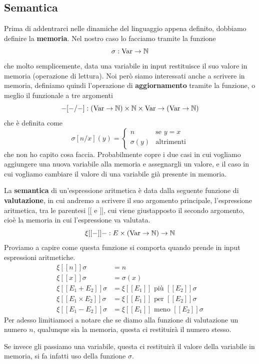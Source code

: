 \subsection{Semantica}
Prima di addentrarci nelle dinamiche del linguaggio appena
definito, dobbiamo definire la \textbf{memoria}. Nel nostro
caso lo facciamo tramite la funzione
\[ \sigma : \operatorname{Var} \to \mathbb{N} \]
che molto semplicemente, data una variabile in input
restituisce il suo valore in memoria (operazione di lettura).
Noi però siamo interessati anche a scrivere in memoria,
definiamo quindi l'operazione di \textbf{aggiornamento}
tramite la funzione, o meglio il funzionale a tre argomenti
\[
	- [ - / - ] : (\operatorname{Var} \to \mathbb{N}) \times
	\mathbb{N} \times \operatorname{Var} \to (\operatorname{Var} \to \mathbb{N})
\]
che è definita come
\[
	\sigma [n / x](y) = \begin{cases}
		n         & \text{se } y = x  \\
		\sigma(y) & \text{altrimenti}
	\end{cases}
\]
che non ho capito cosa faccia. Probabilmente copre i due casi
in cui vogliamo aggiungere una nuova variabile alla memoria
e assegnargli un valore, e il caso in cui vogliamo cambiare
il valore di una variabile già presente in memoria.

La \textbf{semantica} di un'espressione aritmetica è data
dalla seguente funzione di \textbf{valutazione}, in cui andremo
a scrivere il suo argomento principale, l'espressione aritmetica,
tra le parentesi $[[$ e $]]$, cui viene giustapposto il secondo
argomento, cioè la memoria in cui l'espressione va valutata.
\[ \xi [[-]] - : E \times (\operatorname{Var} \to \mathbb{N}) \to \mathbb{N} \]
Proviamo a capire come questa funzione si comporta quando
prende in input espressioni aritmetiche.
\begin{align*}
	\xi [[n]] \sigma              & = n         \\
	\xi [[x]] \sigma              & = \sigma(x) \\
	\xi [[E_1 + E_2]] \sigma      &
	= \xi [[E_1]] \text{ più } [[E_2]] \sigma   \\
	\xi [[E_1 \times E_2]] \sigma &
	= \xi [[ E_1 ]] \text{ per } [[E_2]] \sigma \\
	\xi [[E_1 - E_2]] \sigma      &
	= \xi [[ E_1 ]] \text{ meno } [[E_2]] \sigma
\end{align*}
Per adesso limitiamoci a notare che se diamo alla funzione di
valutazione un numero $n$, qualunque sia la memoria, questa
ci restituirà il numero stesso.

Se invece gli passiamo una variabile, questa ci restituirà
il valore della variabile in memoria, si fa infatti uso della
funzione $\sigma$.

